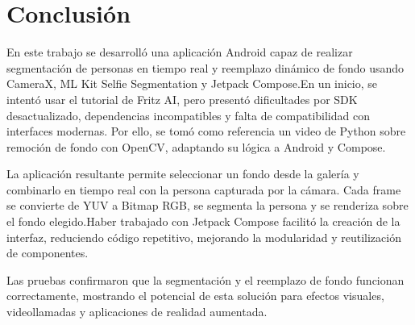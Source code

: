 \documentclass[conference]{IEEEtran}
\begin{document}
\newpage
\section{Conclusión}
En este trabajo se desarrolló una aplicación Android capaz de realizar segmentación de personas en tiempo real y reemplazo dinámico de fondo usando CameraX, ML Kit Selfie Segmentation y Jetpack Compose.En un inicio, se intentó usar el tutorial de Fritz AI, pero presentó dificultades por SDK desactualizado, dependencias incompatibles y falta de compatibilidad con interfaces modernas. Por ello, se tomó como referencia un video de Python sobre remoción de fondo con OpenCV, adaptando su lógica a Android y Compose.

La aplicación resultante permite seleccionar un fondo desde la galería y combinarlo en tiempo real con la persona capturada por la cámara. Cada frame se convierte de YUV a Bitmap RGB, se segmenta la persona y se renderiza sobre el fondo elegido.Haber trabajado con Jetpack Compose facilitó la creación de la interfaz, reduciendo código repetitivo, mejorando la modularidad y reutilización de componentes.

Las pruebas confirmaron que la segmentación y el reemplazo de fondo funcionan correctamente, mostrando el potencial de esta solución para efectos visuales, videollamadas y aplicaciones de realidad aumentada.

\printbibliography
\end{document}
